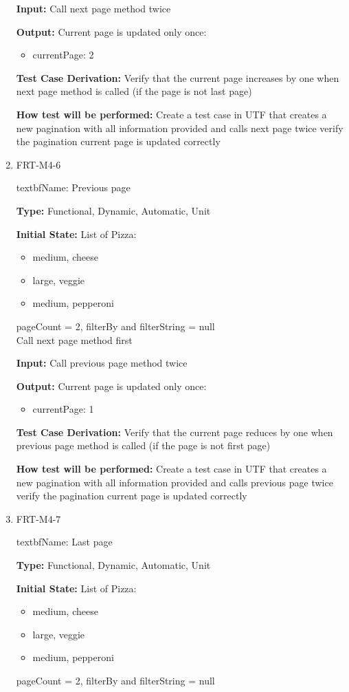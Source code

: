\documentclass[12pt, titlepage]{article}
\begin{document}
\begin{enumerate}
\textbf{Input:} Call next page method twice
					
\textbf{Output:} Current page is updated only once:
\begin{itemize}
\item currentPage: 2
\end{itemize}

\textbf{Test Case Derivation:} Verify that the current page increases by one when next page method is called (if the page is not last page)

\textbf{How test will be performed:} Create a test case in UTF that creates a new pagination with all information provided and calls next page twice verify the pagination current page is updated correctly

\item{FRT-M4-6}

textbf{Name:} Previous page

\textbf{Type:} Functional, Dynamic, Automatic, Unit
					
\textbf{Initial State:} List of Pizza:
\begin{itemize}
\item medium, cheese
\item large, veggie
\item medium, pepperoni
\end{itemize}
pageCount = 2, filterBy and filterString = null\\
Call next page method first
					
\textbf{Input:} Call previous page method twice
					
\textbf{Output:} Current page is updated only once:
\begin{itemize}
\item currentPage: 1
\end{itemize}

\textbf{Test Case Derivation:} Verify that the current page reduces by one when previous page method is called (if the page is not first page)

\textbf{How test will be performed:} Create a test case in UTF that creates a new pagination with all information provided and calls previous page twice verify the pagination current page is updated correctly

\item{FRT-M4-7}

textbf{Name:} Last page

\textbf{Type:} Functional, Dynamic, Automatic, Unit
					
\textbf{Initial State:} List of Pizza:
\begin{itemize}
\item medium, cheese
\item large, veggie
\item medium, pepperoni
\end{itemize}
pageCount = 2, filterBy and filterString = null
					

\end{enumerate}
\end{document}
